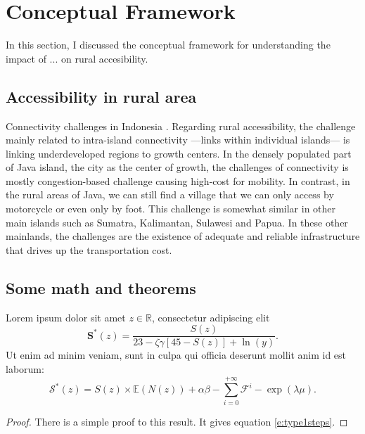 \documentclass[letterpaper,12pt,leqno]{article}
\begin{document}
\section{Conceptual Framework}\label{s:framework}

In this section, I discussed the conceptual framework for understanding the impact of ... on rural accesibility.

\subsection{Accessibility in rural area}

Connectivity challenges in Indonesia \citep{sandee_2016}. Regarding rural accessibility, the challenge mainly related to intra-island connectivity ---links within individual islands--- is linking underdeveloped regions to growth centers. In the densely populated part of Java island, the city as the center of growth, the challenges of connectivity is mostly congestion-based challenge causing high-cost for mobility. In contrast, in the rural areas of Java, we can still find a village that we can only access by motorcycle or even only by foot. This challenge is somewhat similar in other main islands such as Sumatra, Kalimantan, Sulawesi and Papua. In these other mainlands, the challenges are the existence of adequate and reliable infrastructure that drives up the transportation cost.

\subsection{Some math and theorems} 

\begin{proposition}\label{p:type1}  Lorem ipsum dolor sit amet $z \in \mathbb{R}$, consectetur adipiscing elit
\begin{equation}
\bm{S}^*(z) = \frac{S(z)}{23 -\zeta\gamma [45- S(z)] + \ln(y)}.
\label{e:type1}\end{equation}
Ut enim ad minim veniam, sunt in culpa qui officia deserunt mollit anim id est laborum:
\begin{equation}
\mathcal{S}^*(z) = S(z) \times \mathbb{E}(N(z)) + \alpha \beta - \sum_{i=0}^{+\infty}\mathcal{F}^{i}-\exp(\lambda \mu).
\label{e:type1steps}\end{equation}
\end{proposition}

\begin{proof} There is a simple proof to this result. It gives equation \eqref{e:type1steps}.\end{proof} 
\end{document}
